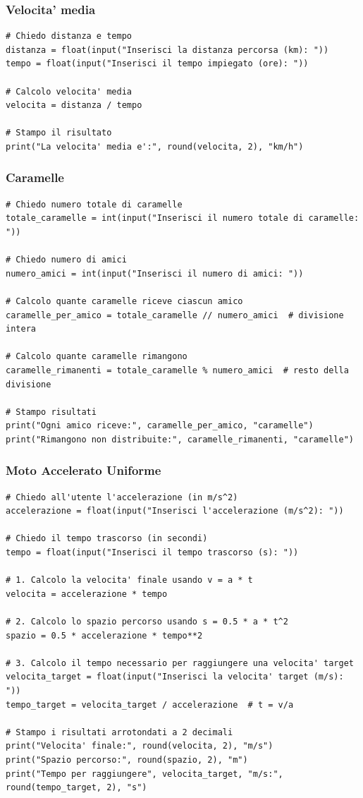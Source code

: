 \documentclass[a4paper,12pt]{article}
\begin{document}
	\newpage
	\subsubsection{Velocita' media}
	\begin{lstlisting}
# Chiedo distanza e tempo
distanza = float(input("Inserisci la distanza percorsa (km): "))
tempo = float(input("Inserisci il tempo impiegato (ore): "))
		
# Calcolo velocita' media
velocita = distanza / tempo
		
# Stampo il risultato
print("La velocita' media e':", round(velocita, 2), "km/h")
	\end{lstlisting}
	
	\newpage
	\subsubsection{Caramelle}
	\begin{lstlisting}
# Chiedo numero totale di caramelle
totale_caramelle = int(input("Inserisci il numero totale di caramelle: "))
	
# Chiedo numero di amici
numero_amici = int(input("Inserisci il numero di amici: "))
		
# Calcolo quante caramelle riceve ciascun amico
caramelle_per_amico = totale_caramelle // numero_amici  # divisione intera
		
# Calcolo quante caramelle rimangono
caramelle_rimanenti = totale_caramelle % numero_amici  # resto della divisione
		
# Stampo risultati
print("Ogni amico riceve:", caramelle_per_amico, "caramelle")
print("Rimangono non distribuite:", caramelle_rimanenti, "caramelle")
	\end{lstlisting}
	
	
	\newpage
	\subsubsection{Moto Accelerato Uniforme}
	
	\begin{lstlisting}
# Chiedo all'utente l'accelerazione (in m/s^2)
accelerazione = float(input("Inserisci l'accelerazione (m/s^2): "))

# Chiedo il tempo trascorso (in secondi)
tempo = float(input("Inserisci il tempo trascorso (s): "))

# 1. Calcolo la velocita' finale usando v = a * t
velocita = accelerazione * tempo

# 2. Calcolo lo spazio percorso usando s = 0.5 * a * t^2
spazio = 0.5 * accelerazione * tempo**2

# 3. Calcolo il tempo necessario per raggiungere una velocita' target
velocita_target = float(input("Inserisci la velocita' target (m/s): "))
tempo_target = velocita_target / accelerazione  # t = v/a

# Stampo i risultati arrotondati a 2 decimali
print("Velocita' finale:", round(velocita, 2), "m/s")
print("Spazio percorso:", round(spazio, 2), "m")
print("Tempo per raggiungere", velocita_target, "m/s:", round(tempo_target, 2), "s")

	\end{lstlisting}
	
\end{document}
